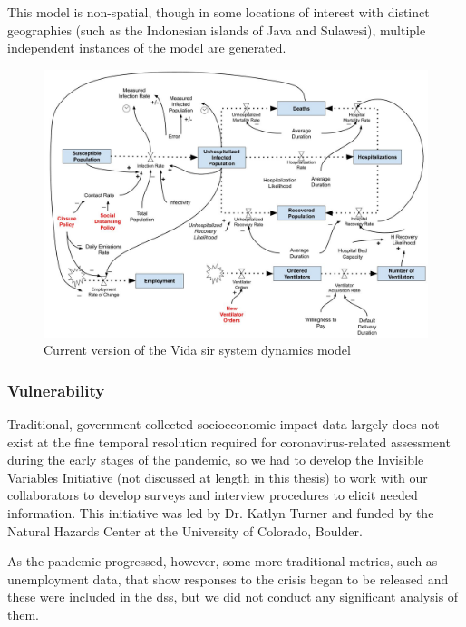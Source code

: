This model is non-spatial, though in some locations of interest with distinct geographies (such as the Indonesian islands of Java and Sulawesi), multiple independent instances of the model are generated.

\begin{figure}[!htb]
	\centering
	\includegraphics[scale=0.25]{Figures/chap5/SD_diagram.jpg}
	\caption[Current version of the Vida SIR system dynamics model]{Current version of the Vida \ac{sir} system dynamics model}
	\label{fig:vida_sd}
\end{figure}


\subsubsection{Vulnerability} \label{sec:vida-evdt-v-method}

Traditional, government-collected socioeconomic impact data largely does not exist at the fine temporal resolution required for coronavirus-related assessment during the early stages of the pandemic, so we had to develop the Invisible Variables Initiative (not discussed at length in this thesis) to work with our collaborators to develop surveys and interview procedures to elicit needed information. This initiative was led by Dr. Katlyn Turner and funded by the Natural Hazards Center at the University of Colorado, Boulder. 

As the pandemic progressed, however, some more traditional metrics, such as unemployment data, that show responses to the crisis began to be released and these were included in the \ac{dss}, but we did not conduct any significant analysis of them.


